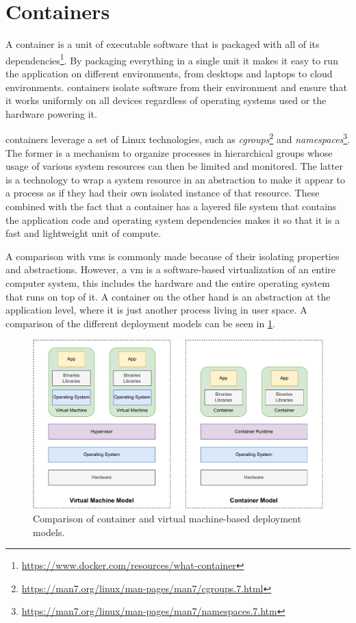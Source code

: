 \section{Containers}
\label{sec:background:containers}


A \gls{container} is a unit of executable software that is packaged with all of its dependencies\footnote{\url{https://www.docker.com/resources/what-container}}. By packaging everything in a single unit it makes it easy to run the application on different environments, from desktops and laptops to cloud environments. \Glspl{container} isolate software from their environment and ensure that it works uniformly on all devices regardless of operating systems used or the hardware powering it. 


\Glspl{container} leverage a set of Linux technologies, such as \textit{cgroups}\footnote{\url{https://man7.org/linux/man-pages/man7/cgroups.7.html}} and \textit{namespaces}\footnote{\url{https://man7.org/linux/man-pages/man7/namespaces.7.htm}}. The former is a mechanism to organize processes in hierarchical groups whose usage of various system resources can then be limited and monitored. The latter is a technology to wrap a system resource in an abstraction to make it appear to a process as if they had their own isolated instance of that resource. These combined with the fact that a container has a layered file system that contains the application code and operating system dependencies makes it so that it is a fast and lightweight unit of compute. 

A comparison with \glspl{vm} is commonly made because of their isolating properties and abstractions. However, a \gls{vm} is a software-based virtualization of an entire computer system, this includes the hardware and the entire operating system that runs on top of it. A \gls{container} on the other hand is an abstraction at the application level, where it is just another process living in user space. A comparison of the different deployment models can be seen in \cref{fig:vm-vs-container}.


\begin{figure}[!t]
    \centering
    
    \includegraphics[width=.9\linewidth]{2_background/figures/vm-vs-container.pdf}

    \caption[Container and virtual machine-based deployment models]{Comparison of container and virtual machine-based deployment models.}
    \label{fig:vm-vs-container}
\end{figure}

